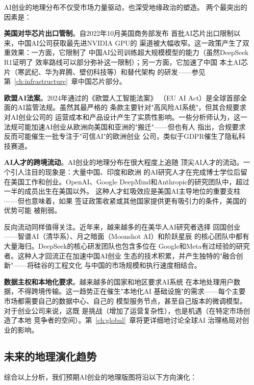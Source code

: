 AI创业的地理分布不仅受市场力量驱动，也深受地缘政治的塑造。
两个最突出的因素是：

\textbf{美国对华芯片出口管制}。自2022年10月美国商务部发布
首批AI芯片出口限制以来，中国AI公司获取最先进NVIDIA GPU的
渠道被大幅收窄。这一政策产生了双重效果：一方面，它限制了
中国AI公司训练超大规模模型的能力（虽然DeepSeek R1证明了
效率路线可以部分弥补这一限制）；另一方面，它加速了中国
本土AI芯片（寒武纪、华为昇腾、壁仞科技等）和替代架构
的研发——参见第~\ref{ch:infrastructure}~章中国芯片部分。

\textbf{欧盟AI法案}。2024年通过的《欧盟人工智能法案》
（EU AI Act）是全球首部全面的AI监管法规。虽然其最严格的
条款主要针对"高风险AI系统"，但其合规要求对AI创业公司的
运营成本和产品设计产生了实质性影响。一些分析师认为，这一
法规可能加速AI创业从欧洲向美国和亚洲的"搬迁"——但也有人
指出，合规要求反而可能催生一批专注于"可信AI"的欧洲创业
公司，类似于GDPR催生了隐私科技赛道。

\textbf{AI人才的跨境流动}。AI创业的地理分布在很大程度上追随
顶尖AI人才的流动。一个引人注目的现象是：大量中国、印度和欧洲
的AI研究人才在完成博士学位后留在美国工作和创业。OpenAI、Google
DeepMind和Anthropic的研究团队中，超过一半的成员出生在美国以外。
这种人才虹吸效应是美国AI主导地位的重要支柱——但也意味着，如果
签证政策收紧或其他国家提供更有吸引力的条件，美国的优势可能
被削弱。

反向流动同样值得关注。近年来，越来越多的在美华人AI研究者选择
回国创业——智谱AI（清华系）、月之暗面（Moonshot AI）和阶跃星辰
的核心团队中都有大量海归。DeepSeek的核心研发团队也包含多位在
Google和Meta有过经验的研究者。这种人才回流正在加速中国AI创业
生态的技术积累，并产生独特的"融合创新"——将硅谷的工程文化
与中国的市场规模和执行速度相结合。

\textbf{数据主权和本地化要求}。越来越多的国家和地区要求AI系统
在本地处理用户数据，不得跨境传输。这一趋势正在催生"本地化AI
基础设施"的需求——每个主要市场都需要自己的数据中心、自己的
模型服务节点，甚至自己版本的微调模型。对于创业公司来说，这既
是挑战（增加了运营复杂性），也是机遇（在特定市场创造了本地
竞争者的空间）。第~\ref{ch:global}~章将更详细地讨论全球AI
治理格局对创业的影响。

\subsection{未来的地理演化趋势}

综合以上分析，我们预期AI创业的地理版图将沿以下方向演化：

